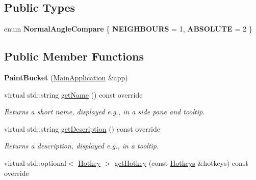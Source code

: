 \subsection*{Public Types}
\begin{DoxyCompactItemize}
\item 
\mbox{\label{classpepr3d_1_1_paint_bucket_a9e31fe563fd8e90416c17e18ab58b8a3}} 
enum {\bfseries Normal\+Angle\+Compare} \{ {\bfseries N\+E\+I\+G\+H\+B\+O\+U\+RS} = 1, 
{\bfseries A\+B\+S\+O\+L\+U\+TE} = 2
 \}
\end{DoxyCompactItemize}
\subsection*{Public Member Functions}
\begin{DoxyCompactItemize}
\item 
\mbox{\label{classpepr3d_1_1_paint_bucket_a48ecf4d542b2ada2c2a9b51669f75bcb}} 
{\bfseries Paint\+Bucket} (\mbox{\hyperlink{classpepr3d_1_1_main_application}{Main\+Application}} \&app)
\item 
\mbox{\label{classpepr3d_1_1_paint_bucket_ab714ccf52a91777feb38d1149bda8451}} 
virtual std\+::string \mbox{\hyperlink{classpepr3d_1_1_paint_bucket_ab714ccf52a91777feb38d1149bda8451}{get\+Name}} () const override
\begin{DoxyCompactList}\small\item\em Returns a short name, displayed e.\+g., in a side pane and tooltip. \end{DoxyCompactList}\item 
\mbox{\label{classpepr3d_1_1_paint_bucket_af756844e2801c8da35fffb900fc2d831}} 
virtual std\+::string \mbox{\hyperlink{classpepr3d_1_1_paint_bucket_af756844e2801c8da35fffb900fc2d831}{get\+Description}} () const override
\begin{DoxyCompactList}\small\item\em Returns a description, displayed e.\+g., in a tooltip. \end{DoxyCompactList}\item 
\mbox{\label{classpepr3d_1_1_paint_bucket_a5707861e941cb4b2337a6b8b8da9c739}} 
virtual std\+::optional$<$ \mbox{\hyperlink{structpepr3d_1_1_hotkey}{Hotkey}} $>$ \mbox{\hyperlink{classpepr3d_1_1_paint_bucket_a5707861e941cb4b2337a6b8b8da9c739}{get\+Hotkey}} (const \mbox{\hyperlink{classpepr3d_1_1_hotkeys}{Hotkeys}} \&hotkeys) const override

\end{DoxyCompactItemize}
